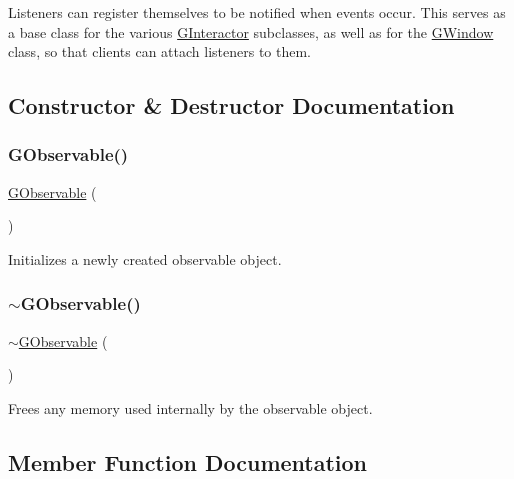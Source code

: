Listeners can register themselves to be notified when events occur. This serves as a base class for the various \mbox{\hyperlink{classGInteractor}{G\+Interactor}} subclasses, as well as for the \mbox{\hyperlink{classGWindow}{G\+Window}} class, so that clients can attach listeners to them. 

\subsection{Constructor \& Destructor Documentation}
\mbox{\label{classGObservable_aa083d318cdd2a045471445fbbd26b919}} 
\subsubsection{\texorpdfstring{G\+Observable()}{GObservable()}}
{\footnotesize\ttfamily \mbox{\hyperlink{classGObservable}{G\+Observable}} (\begin{DoxyParamCaption}{ }\end{DoxyParamCaption})}



Initializes a newly created observable object. 

\mbox{\label{classGObservable_a755e7879db8b0a71916cfde365d49305}} 
\subsubsection{\texorpdfstring{$\sim$\+G\+Observable()}{~GObservable()}}
{\footnotesize\ttfamily $\sim$\mbox{\hyperlink{classGObservable}{G\+Observable}} (\begin{DoxyParamCaption}{ }\end{DoxyParamCaption})\hspace{0.3cm}{\ttfamily [virtual]}}



Frees any memory used internally by the observable object. 



\subsection{Member Function Documentation}
\mbox{\label{classGObservable_a80cfa040459ff53594adbd6a51ec8f43}} 
